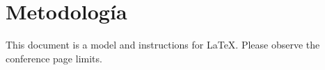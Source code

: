 \section{Metodología}
This document is a model and instructions for \LaTeX.
Please observe the conference page limits. 
